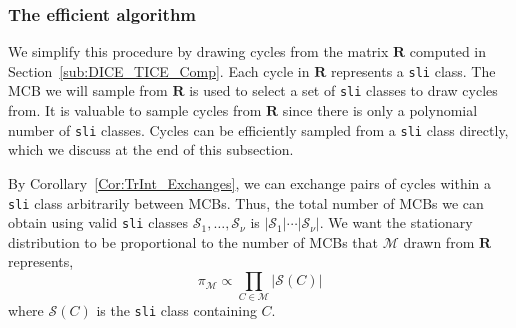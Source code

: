 \documentclass[fleqn,11pt]{article}
\newcommand\calM{\mathcal{M}}
\newcommand\calS{\mathcal{S}}     %
\begin{document}

\subsubsection{The efficient algorithm}

We simplify this procedure by drawing cycles from the matrix $\bm{R}$ computed in Section~\ref{sub:DICE_TICE_Comp}. %
Each cycle in $\bm{R}$ represents a {\tt sli} class. 
The MCB we will sample from $\bm{R}$ is used to select a set of {\tt sli} classes to draw cycles from. 
It is valuable to sample cycles from $\bm{R}$ since there is only a polynomial number of {\tt sli} classes. Cycles can be efficiently sampled from a {\tt sli} class directly, which we discuss at the end of this subsection. 


By Corollary~\ref{Cor:TrInt_Exchanges}, we can exchange pairs of cycles within a {\tt sli} class arbitrarily between MCBs. 
Thus, the total number of MCBs we can obtain using valid {\tt sli} classes $\calS_1,\hdots,\calS_\nu$ is $|\calS_1|\cdots|\calS_\nu|$. 
We want the stationary distribution to be proportional to the number of MCBs that $\calM$ drawn from $\bm{R}$ represents,
\begin{equation}
	\pi_\calM \propto \prod_{C\in\calM} |\calS(C)|
	\label{eq:rand_stat_dist}
\end{equation}
where $\calS(C)$ is the {\tt sli} class containing $C$.
\end{document}
